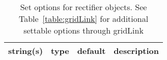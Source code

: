 \begin{table}[ht]
\centering
\begin{tabular}{p{5cm} c c p{7cm}}
\hline
string(s) & type & default & description \\
\hline
\hline
\end{tabular}
\caption{Set options for rectifier objects. See Table~\ref{table:gridLink} for additional settable options through gridLink}
\label{table:rectifier}
\end{table}

